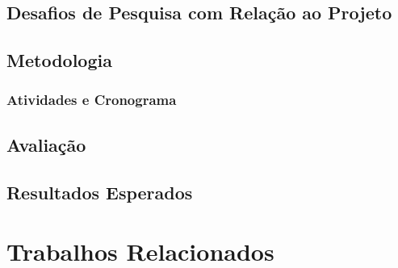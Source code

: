 \documentclass[a4paper,11pt]{article}
\begin{document}
\subsection{Desafios de Pesquisa com Relação ao Projeto}\label{desafios}

\subsection{Metodologia}\label{sec:metodologia}

   
\subsubsection{Atividades e Cronograma}\label{sec:atividadeECronograma}


\subsection{Avaliação}\label{sec:avaliacao}

\subsection{Resultados Esperados}\label{sec:ResultadosEsperados}

\section{Trabalhos Relacionados}\label{sec:relacionados}
 
     

\singlespacing 


\end{document}
